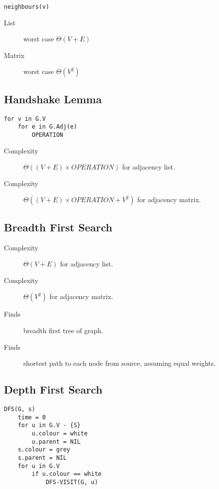 \documentclass[landscape]{cheat}
\begin{document}
\begin{multicols*}{3}
\begin{lstlisting}
neighbours(v)
\end{lstlisting}
\begin{description}
    \item[List] worst case $\Theta(V + E)$
    \item[Matrix] worst case $\Theta(V^2)$
\end{description}


\subsection{Handshake Lemma}
\begin{lstlisting}
for v in G.V
    for e in G.Adj(e)
        OPERATION
\end{lstlisting}
\begin{description}
    \item[Complexity] $\Theta((V+E) \times OPERATION)$ for adjacency list.
    \item[Complexity] $\Theta((V+E) \times OPERATION + V^2)$ for adjacency matrix.
\end{description}

\subsection{Breadth First Search}
\begin{description}
    \item[Complexity] $\Theta(V+E)$ for adjacency list.
    \item[Complexity] $\Theta(V^2)$ for adjacency matrix.
    \item[Finds] breadth first tree of graph.
    \item[Finds] shortest path to each node from source, assuming equal weights.
\end{description}

\subsection{Depth First Search}
\begin{lstlisting}
DFS(G, s)
    time = 0
    for u in G.V - {S}
        u.colour = white
        u.parent = NIL
    s.colour = grey
    s.parent = NIL
    for u in G.V
        if u.colour == white
            DFS-VISIT(G, u)


\end{lstlisting}
\end{multicols*}
\end{document}
